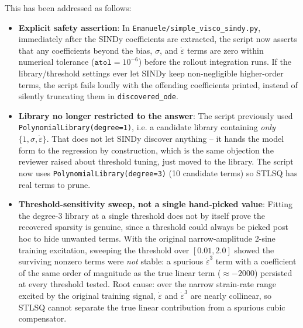 \documentclass{article}
\begin{document}
This has been addressed as follows:
\begin{itemize}
    \item \textbf{Explicit safety assertion}: In \texttt{Emanuele/simple\_visco\_sindy.py}, immediately after the SINDy coefficients are extracted, the script now asserts that any coefficients beyond the bias, $\sigma$, and $\dot{\varepsilon}$ terms are zero within numerical tolerance ($\texttt{atol}=10^{-6}$) before the rollout integration runs. If the library/threshold settings ever let SINDy keep non-negligible higher-order terms, the script fails loudly with the offending coefficients printed, instead of silently truncating them in \texttt{discovered\_ode}.
    \item \textbf{Library no longer restricted to the answer}: The script previously used \texttt{PolynomialLibrary(degree=1)}, i.e. a candidate library containing \emph{only} $\{1, \sigma, \dot{\varepsilon}\}$. That does not let SINDy discover anything -- it hands the model form to the regression by construction, which is the same objection the reviewer raised about threshold tuning, just moved to the library. The script now uses \texttt{PolynomialLibrary(degree=3)} (10 candidate terms) so STLSQ has real terms to prune.
    \item \textbf{Threshold-sensitivity sweep, not a single hand-picked value}: Fitting the degree-3 library at a single threshold does not by itself prove the recovered sparsity is genuine, since a threshold could always be picked post hoc to hide unwanted terms. With the original narrow-amplitude 2-sine training excitation, sweeping the threshold over $[0.01, 2.0]$ showed the surviving nonzero terms were \emph{not} stable: a spurious $\dot{\varepsilon}^3$ term with a coefficient of the same order of magnitude as the true linear term ($\approx -2000$) persisted at every threshold tested. Root cause: over the narrow strain-rate range excited by the original training signal, $\dot{\varepsilon}$ and $\dot{\varepsilon}^3$ are nearly collinear, so STLSQ cannot separate the true linear contribution from a spurious cubic compensator.

\end{itemize}
\end{document}
